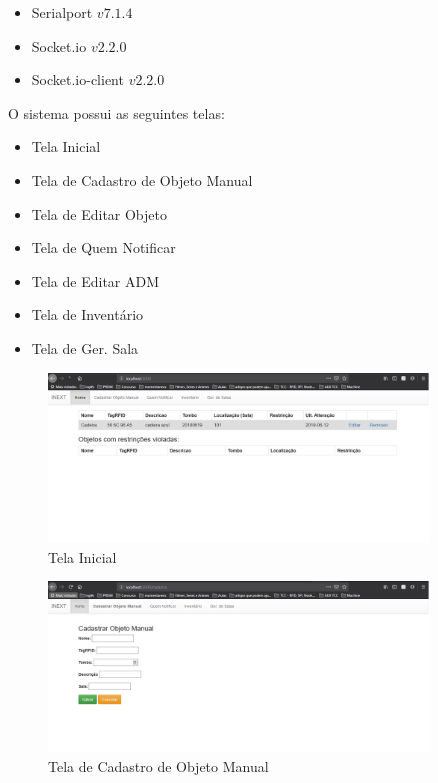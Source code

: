 \begin{itemize}
    \item Serialport $v7.1.4$
    \item Socket.io $v2.2.0$
    \item Socket.io-client $v2.2.0$
\end{itemize}
\par 
O sistema possui as seguintes telas:
\begin{itemize}
    \item Tela Inicial
    \item Tela de Cadastro de Objeto Manual
    \item Tela de Editar Objeto
    \item Tela de Quem Notificar
    \item Tela de Editar ADM
    \item Tela de Inventário
    \item Tela de Ger. Sala
\end{itemize}    
    \begin{figure}[H]
              \caption{\label{fig:tela_inical2}Tela Inicial }
              \centering
              \includegraphics[width=0.9\textwidth]{Figuras/tela_inical2.PNG}
    \end{figure}
    
    \begin{figure}[H]
              \caption{\label{fig:tela_cadastro_manual}Tela de Cadastro de Objeto Manual}
              \centering
              \includegraphics[width=0.9\textwidth]{Figuras/tela_cadastro_manual.png}
    \end{figure}
    
